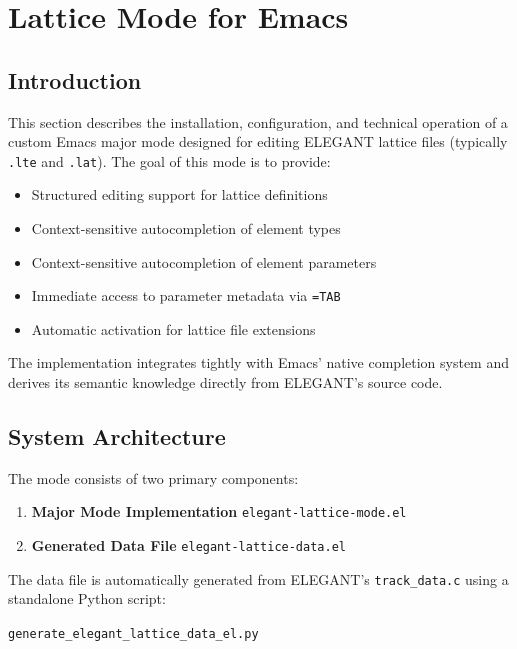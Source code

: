 
\lstset{
  basicstyle=\ttfamily\small,
  breaklines=true,
  columns=fullflexible,
  frame=single,
  keepspaces=true
}

\section{Lattice Mode for Emacs}

\subsection{Introduction}

This section describes the installation, configuration, and technical operation of a custom Emacs major mode designed for editing ELEGANT lattice files (typically \texttt{.lte} and \texttt{.lat}).  
The goal of this mode is to provide:
\begin{itemize}
\item Structured editing support for lattice definitions
\item Context-sensitive autocompletion of element types
\item Context-sensitive autocompletion of element parameters
\item Immediate access to parameter metadata via \texttt{=TAB}
\item Automatic activation for lattice file extensions
\end{itemize}

The implementation integrates tightly with Emacs’ native completion system and derives its semantic knowledge directly from ELEGANT’s source code.

\subsection{System Architecture}

The mode consists of two primary components:
\begin{enumerate}
\item \textbf{Major Mode Implementation}  
      \texttt{elegant-lattice-mode.el}

\item \textbf{Generated Data File}  
      \texttt{elegant-lattice-data.el}
\end{enumerate}

The data file is automatically generated from ELEGANT’s \texttt{track\_data.c} using a standalone Python script:

\begin{center}
\texttt{generate\_elegant\_lattice\_data\_el.py}
\end{center}

